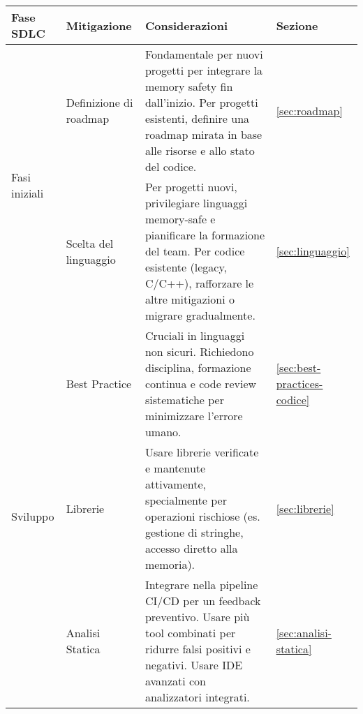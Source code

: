 \begin{table}[htbp]
  \centering
  \footnotesize
  
  \renewcommand{\arraystretch}{1.2}
  \begin{tabular}{|p{2.5cm}|p{2.25cm}|p{8.25cm}|p{2.8cm}|}
    \hline
    \textbf{Fase SDLC}                                                        & \textbf{Mitigazione}                   & \textbf{Considerazioni}                                                                                                                                                                    & \textbf{Sezione}                      \\
    \hline %
    \multirow{2}{2.5cm}{\centering\arraybackslash Fasi iniziali}              & Definizione di roadmap                 & Fondamentale per nuovi progetti per integrare la memory safety fin dall'inizio. Per progetti esistenti, definire una roadmap mirata in base alle risorse e allo stato del codice.          & \autoref{sec:roadmap}                 \\
    \cline{2-4}                                                               & Scelta del linguaggio                  & Per progetti nuovi, privilegiare linguaggi memory-safe e pianificare la formazione del team. Per codice esistente (legacy, C/C++), rafforzare le altre mitigazioni o migrare gradualmente. & \autoref{sec:linguaggio}              \\
    \hline %
    \multirow{3}{2.5cm}{\centering\arraybackslash Sviluppo}                   & Best Practice                          & Cruciali in linguaggi non sicuri. Richiedono disciplina, formazione continua e code review sistematiche per minimizzare l'errore umano.                                                    & \autoref{sec:best-practices-codice}   \\
    \cline{2-4}                                                               & Librerie                               & Usare librerie verificate e mantenute attivamente, specialmente per operazioni rischiose (es. gestione di stringhe, accesso diretto alla memoria).                                         & \autoref{sec:librerie}                \\
    \cline{2-4}                                                               & Analisi Statica                        & Integrare nella pipeline CI/CD per un feedback preventivo. Usare più tool combinati per ridurre falsi positivi e negativi. Usare IDE avanzati con analizzatori integrati.                  & \autoref{sec:analisi-statica}         \\

\end{tabular}
\end{table}
